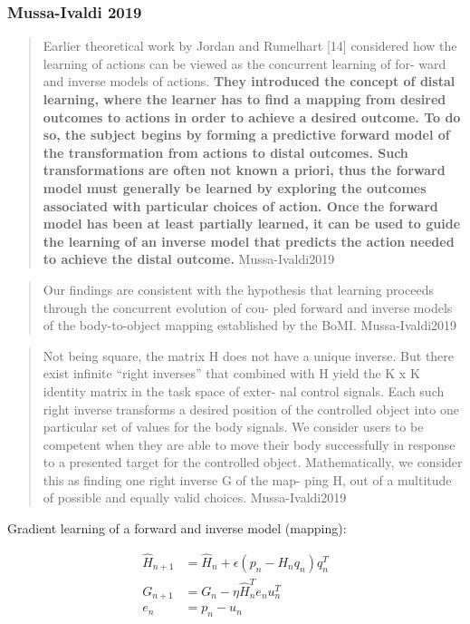 \subsubsection{Mussa-Ivaldi 2019}\label{mussa-ivaldi-2019}

\begin{quote}
Earlier theoretical work by Jordan and Rumelhart {[}14{]} considered how
the learning of actions can be viewed as the concurrent learning of for-
ward and inverse models of actions. \textbf{They introduced the concept
of distal learning, where the learner has to find a mapping from desired
outcomes to actions in order to achieve a desired outcome. To do so, the
subject begins by forming a predictive forward model of the
transformation from actions to distal outcomes. Such transformations are
often not known a priori, thus the forward model must generally be
learned by exploring the outcomes associated with particular choices of
action. Once the forward model has been at least partially learned, it
can be used to guide the learning of an inverse model that predicts the
action needed to achieve the distal outcome.} Mussa-Ivaldi2019
\end{quote}

\begin{quote}
Our findings are consistent with the hypothesis that learning proceeds
through the concurrent evolution of cou- pled forward and inverse models
of the body-to-object mapping established by the BoMI. Mussa-Ivaldi2019
\end{quote}

\begin{quote}
Not being square, the matrix H does not have a unique inverse. But there
exist infinite ``right inverses'' that combined with H yield the K x K
identity matrix in the task space of exter- nal control signals. Each
such right inverse transforms a desired position of the controlled
object into one particular set of values for the body signals. We
consider users to be competent when they are able to move their body
successfully in response to a presented target for the controlled
object. Mathematically, we consider this as finding one right inverse G
of the map- ping H, out of a multitude of possible and equally valid
choices. Mussa-Ivaldi2019
\end{quote}

Gradient learning of a forward and inverse model (mapping):

\begin{align*}
    \hat{H}_{n+1} &= \hat{H}_n + \epsilon(p_n - H_nq_n)q_n^T  \\
    G_{n+1} &= G_n - \eta\hat{H}_n^Te_nu_n^T \\
    e_n &= p_n - u_n
\end{align*}

